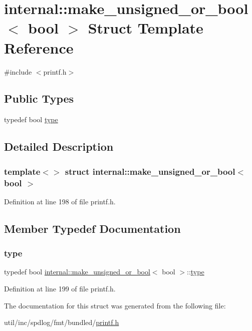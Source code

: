 \hypertarget{structinternal_1_1make__unsigned__or__bool_3_01bool_01_4}{}\section{internal\+:\+:make\+\_\+unsigned\+\_\+or\+\_\+bool$<$ bool $>$ Struct Template Reference}
\label{structinternal_1_1make__unsigned__or__bool_3_01bool_01_4}


{\ttfamily \#include $<$printf.\+h$>$}

\subsection*{Public Types}
\begin{DoxyCompactItemize}
\item 
typedef bool \hyperlink{structinternal_1_1make__unsigned__or__bool_3_01bool_01_4_a628a504d6e878ffe0f2bc69efd1a42cd}{type}
\end{DoxyCompactItemize}


\subsection{Detailed Description}
\subsubsection*{template$<$$>$\newline
struct internal\+::make\+\_\+unsigned\+\_\+or\+\_\+bool$<$ bool $>$}



Definition at line 198 of file printf.\+h.



\subsection{Member Typedef Documentation}
\mbox{\label{structinternal_1_1make__unsigned__or__bool_3_01bool_01_4_a628a504d6e878ffe0f2bc69efd1a42cd}} 
\subsubsection{\texorpdfstring{type}{type}}
{\footnotesize\ttfamily typedef bool \hyperlink{structinternal_1_1make__unsigned__or__bool}{internal\+::make\+\_\+unsigned\+\_\+or\+\_\+bool}$<$ bool $>$\+::\hyperlink{structinternal_1_1make__unsigned__or__bool_3_01bool_01_4_a628a504d6e878ffe0f2bc69efd1a42cd}{type}}



Definition at line 199 of file printf.\+h.



The documentation for this struct was generated from the following file\+:\begin{DoxyCompactItemize}
\item 
util/inc/spdlog/fmt/bundled/\hyperlink{printf_8h}{printf.\+h}\end{DoxyCompactItemize}
